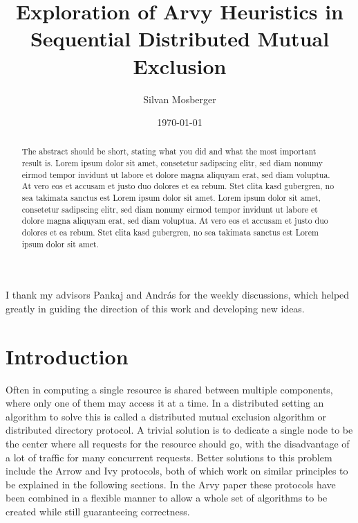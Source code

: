 \documentclass[a4paper, oneside]{discothesis}
\title{Exploration of Arvy Heuristics in Sequential Distributed Mutual Exclusion}
\author{Silvan Mosberger}
\institute{Distributed Computing Group \\[2pt]
Computer Engineering and Networks Laboratory \\[2pt]
ETH Zürich}
\date{\today}
\begin{document}
\frontmatter %
\maketitle

\cleardoublepage

\begin{acknowledgements}
I thank my advisors Pankaj and András for the weekly discussions, which helped greatly in guiding the direction of this work and developing new ideas.
\end{acknowledgements}


\begin{abstract}
The abstract should be short, stating what you did and what the most important result is.
Lorem ipsum dolor sit amet, consetetur sadipscing elitr, sed diam nonumy eirmod tempor invidunt ut labore et dolore magna aliquyam erat, sed diam voluptua. At vero eos et accusam et justo duo dolores et ea rebum. Stet clita kasd gubergren, no sea takimata sanctus est Lorem ipsum dolor sit amet. Lorem ipsum dolor sit amet, consetetur sadipscing elitr, sed diam nonumy eirmod tempor invidunt ut labore et dolore magna aliquyam erat, sed diam voluptua. At vero eos et accusam et justo duo dolores et ea rebum. Stet clita kasd gubergren, no sea takimata sanctus est Lorem ipsum dolor sit amet.
\end{abstract}

\tableofcontents

\mainmatter

\chapter{Introduction}

Often in computing a single resource is shared between multiple components, where only one of them may access it at a time. In a distributed setting an algorithm to solve this is called a distributed mutual exclusion algorithm or distributed directory protocol. A trivial solution is to dedicate a single node to be the center where all requests for the resource should go, with the disadvantage of a lot of traffic for many concurrent requests. Better solutions to this problem include the Arrow and Ivy protocols, both of which work on similar principles to be explained in the following sections. In the Arvy paper these protocols have been combined in a flexible manner to allow a whole set of algorithms to be created while still guaranteeing correctness.
\end{document}
